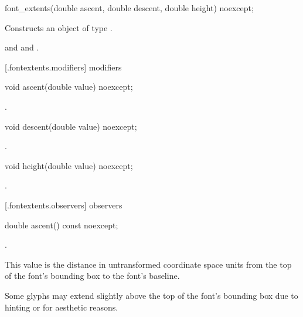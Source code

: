 \begin{itemdecl}
    font_extents(double ascent, double descent, double height) noexcept;
\end{itemdecl}
\begin{itemdescr}
	\pnum
	\effects
	Constructs an object of type .
	
	\pnum
	\postconditions
	 and  and .
\end{itemdescr}

 [\iotwod.fontextents.modifiers]{ modifiers}

\begin{itemdecl}
    void ascent(double value) noexcept;
\end{itemdecl}

\begin{itemdescr}
	\pnum
	\postconditions
	.
\end{itemdescr}

\begin{itemdecl}
    void descent(double value) noexcept;
\end{itemdecl}

\begin{itemdescr}
	\pnum
	\postconditions
	.
	
\end{itemdescr}

\begin{itemdecl}
    void height(double value) noexcept;
\end{itemdecl}

\begin{itemdescr}
	\pnum
	\postconditions
	.
	
\end{itemdescr}

 [\iotwod.fontextents.observers]{ observers}

\begin{itemdecl}
    double ascent() const noexcept;
\end{itemdecl}
\begin{itemdescr}
	\pnum
	\returns
	.
	
	\pnum
	\remarks
	This value is the distance in untransformed coordinate space units from the top of the font's bounding box to the font's baseline.
	
	\pnum
	Some glyphs may extend slightly above the top of the font's bounding box due to hinting or for aesthetic reasons.

\end{itemdescr}

